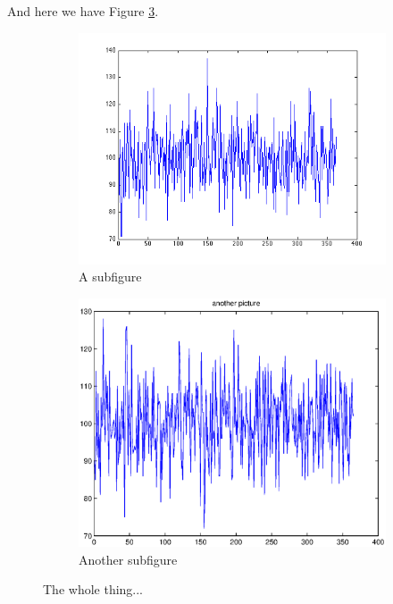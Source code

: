 And here we have Figure \ref{fig:figure2}.


\begin{figure}
\centering
\begin{subfigure}{.45\textwidth}
  \centering
  \includegraphics[width=0.95\linewidth]{fig1}
  \caption{A subfigure}
  \label{fig2:sub1}
\end{subfigure}
\begin{subfigure}{.45\textwidth}
  \centering
  \includegraphics[width=0.95\linewidth]{fig2}
  \caption{Another subfigure}
  \label{fig2:sub2}
\end{subfigure}
\caption{The whole thing...}
\label{fig:figure2}
\end{figure}


